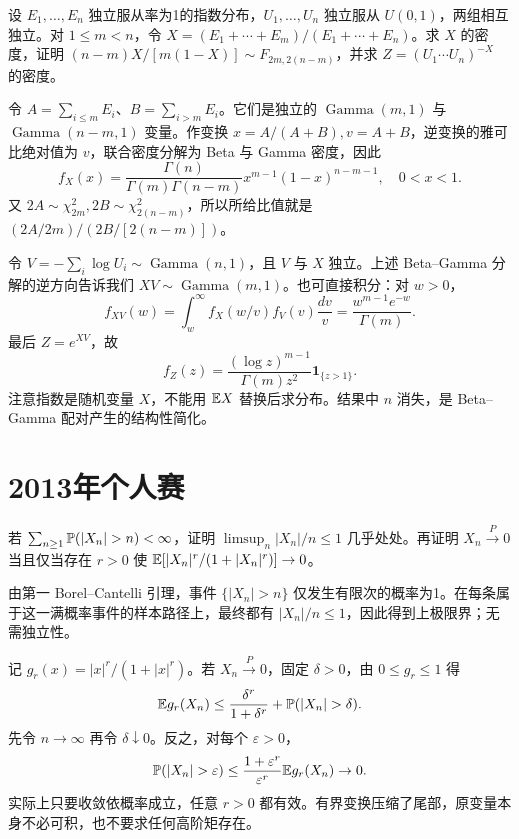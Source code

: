 \begin{example}[原题6：指数比例与随机幂]\label{yau:2012-6}
设 $E_1,\ldots,E_n$ 独立服从率为1的指数分布，$U_1,\ldots,U_n$ 独立服从 $U(0,1)$，两组相互独立。对 $1\le m<n$，令 $X=(E_1+\cdots+E_m)/(E_1+\cdots+E_n)$。求 $X$ 的密度，证明 $(n-m)X/[m(1-X)]\sim F_{2m,2(n-m)}$，并求 $Z=(U_1\cdots U_n)^{-X}$ 的密度。
\end{example}
\begin{solve}
令 $A=\sum_{i\le m}E_i$、$B=\sum_{i>m}E_i$。它们是独立的 $\operatorname{Gamma}(m,1)$ 与 $\operatorname{Gamma}(n-m,1)$ 变量。作变换 $x=A/(A+B),v=A+B$，逆变换的雅可比绝对值为 $v$，联合密度分解为 Beta 与 Gamma 密度，因此
\[
f_X(x)=\frac{\Gamma(n)}{\Gamma(m)\Gamma(n-m)}x^{m-1}(1-x)^{n-m-1},\quad0<x<1.
\]
又 $2A\sim\chi^2_{2m},2B\sim\chi^2_{2(n-m)}$，所以所给比值就是 $(2A/2m)/(2B/[2(n-m)])$。

令 $V=-\sum_i\log U_i\sim\operatorname{Gamma}(n,1)$，且 $V$ 与 $X$ 独立。上述 Beta--Gamma 分解的逆方向告诉我们 $XV\sim\operatorname{Gamma}(m,1)$。也可直接积分：对 $w>0$，
\[
f_{XV}(w)=\int_w^\infty f_X(w/v)f_V(v)\frac{dv}{v}=\frac{w^{m-1}e^{-w}}{\Gamma(m)}.
\]
最后 $Z=e^{XV}$，故
\[
f_Z(z)=\frac{(\log z)^{m-1}}{\Gamma(m)z^2}\mathbf1_{\{z>1\}}.
\]
注意指数是随机变量 $X$，不能用 $\mathbb E X$ 替换后求分布。结果中 $n$ 消失，是 Beta--Gamma 配对产生的结构性简化。
\end{solve}

\section{2013年个人赛}
\begin{example}[原题1：尾概率与有界变换]\label{yau:2013-1}
若 $\sum_{n\ge1}\PP(|X_n|>n)<\infty$，证明 $\limsup_n|X_n|/n\le1$ 几乎处处。再证明 $X_n\xrightarrow P0$ 当且仅当存在 $r>0$ 使 $\mathbb E[|X_n|^r/(1+|X_n|^r)]\to0$。
\end{example}
\begin{solve}
由第一 Borel--Cantelli 引理，事件 $\{|X_n|>n\}$ 仅发生有限次的概率为1。在每条属于这一满概率事件的样本路径上，最终都有 $|X_n|/n\le1$，因此得到上极限界；无需独立性。

记 $g_r(x)=|x|^r/(1+|x|^r)$。若 $X_n\xrightarrow P0$，固定 $\delta>0$，由 $0\le g_r\le1$ 得
\[
\E g_r(X_n)\le\frac{\delta^r}{1+\delta^r}+\PP(|X_n|>\delta).
\]
先令 $n\to\infty$ 再令 $\delta\downarrow0$。反之，对每个 $\varepsilon>0$，
\[
\PP(|X_n|>\varepsilon)\le\frac{1+\varepsilon^r}{\varepsilon^r}\E g_r(X_n)\to0.
\]
实际上只要收敛依概率成立，任意 $r>0$ 都有效。有界变换压缩了尾部，原变量本身不必可积，也不要求任何高阶矩存在。
\end{solve}

